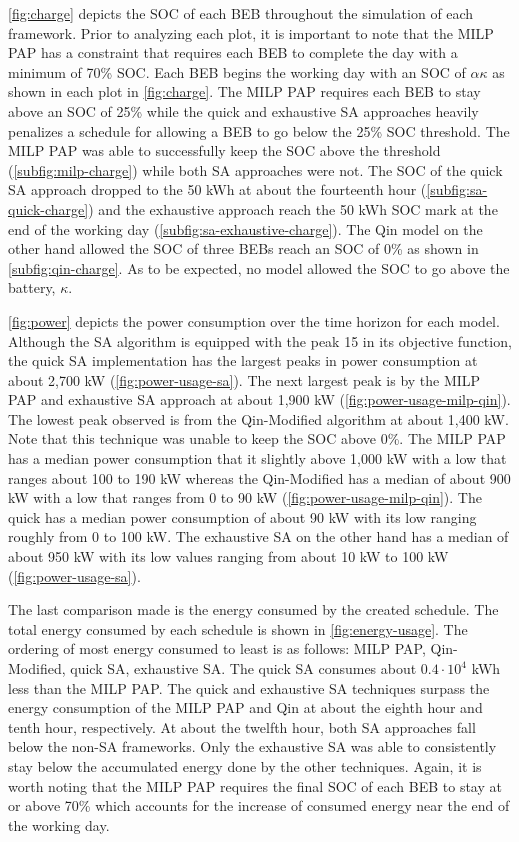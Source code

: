 \documentclass[11pt,a4paper,final]{article}
\begin{document}
\ref{fig:charge} depicts the SOC of each BEB throughout the simulation of each framework. Prior to analyzing each plot,
it is important to note that the MILP PAP has a constraint that requires each BEB to complete the day with a minimum of
70\% SOC. Each BEB begins the working day with an SOC of \(\alpha\kappa\) as shown in each plot in \ref{fig:charge}. The MILP PAP
requires each BEB to stay above an SOC of 25\% while the quick and exhaustive SA approaches heavily penalizes a schedule
for allowing a BEB to go below the 25\% SOC threshold. The MILP PAP was able to successfully keep the SOC above the
threshold (\ref{subfig:milp-charge}) while both SA approaches were not. The SOC of the quick SA approach dropped to the
50 kWh at about the fourteenth hour (\ref{subfig:sa-quick-charge}) and the exhaustive approach reach the 50 kWh SOC mark
at the end of the working day (\ref{subfig:sa-exhaustive-charge}). The Qin model on the other hand allowed the SOC of
three BEBs reach an SOC of 0\% as shown in \ref{subfig:qin-charge}. As to be expected, no model allowed the SOC to go
above the battery, \(\kappa\).

\ref{fig:power} depicts the power consumption over the time horizon for each model. Although the SA algorithm is
equipped with the peak 15 in its objective function, the quick SA implementation has the largest peaks in power
consumption at about 2,700 kW (\ref{fig:power-usage-sa}). The next largest peak is by the MILP PAP and exhaustive SA
approach at about 1,900 kW (\ref{fig:power-usage-milp-qin}). The lowest peak observed is from the Qin-Modified algorithm
at about 1,400 kW. Note that this technique was unable to keep the SOC above 0\%. The MILP PAP has a median power
consumption that it slightly above 1,000 kW with a low that ranges about 100 to 190 kW whereas the Qin-Modified has a
median of about 900 kW with a low that ranges from 0 to 90 kW (\ref{fig:power-usage-milp-qin}). The quick has a median
power consumption of about 90 kW with its low ranging roughly from 0 to 100 kW. The exhaustive SA on the other hand has
a median of about 950 kW with its low values ranging from about 10 kW to 100 kW (\ref{fig:power-usage-sa}).

The last comparison made is the energy consumed by the created schedule. The total energy consumed by each schedule is
shown in \ref{fig:energy-usage}. The ordering of most energy consumed to least is as follows: MILP PAP, Qin-Modified,
quick SA, exhaustive SA. The quick SA consumes about \(0.4 \cdot 10^4\) kWh less than the MILP PAP. The quick and exhaustive
SA techniques surpass the energy consumption of the MILP PAP and Qin at about the eighth hour and tenth hour,
respectively. At about the twelfth hour, both SA approaches fall below the non-SA frameworks. Only the exhaustive SA was
able to consistently stay below the accumulated energy done by the other techniques. Again, it is worth noting that the
MILP PAP requires the final SOC of each BEB to stay at or above 70\% which accounts for the increase of consumed energy
near the end of the working day.
\end{document}
